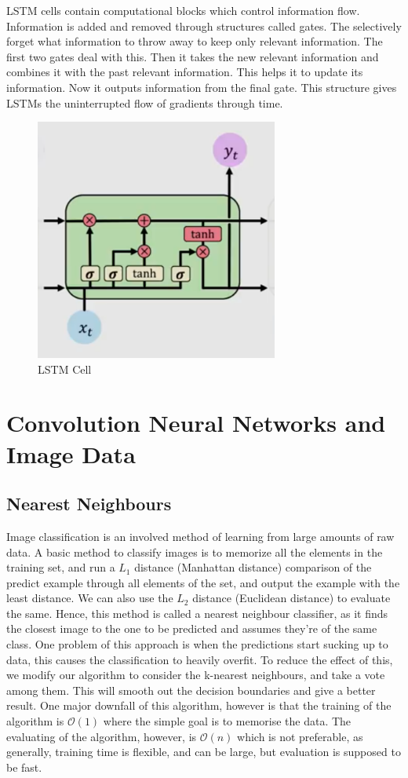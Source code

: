 \documentclass{article}
\begin{document}
LSTM cells contain computational blocks which control information flow. Information is added and removed through structures called gates. The selectively forget what information to throw away to keep only relevant information. The first two gates deal with this. Then it takes the new relevant information and combines it with the past relevant information. This helps it to update its information. Now it outputs information from the final gate. This structure gives LSTMs the uninterrupted flow of gradients through time.

\begin{figure}[h]
\includegraphics[width=8cm]{Images/lstm_cell.png}
\centering
\caption{LSTM Cell}
\end{figure}


\section{Convolution Neural Networks and Image Data}

\subsection{Nearest Neighbours}

Image classification is an involved method of learning from large amounts of raw data. A basic method to classify images is to memorize all the elements in the training set, and run a $L_1$ distance (Manhattan distance) comparison of the predict example through all elements of the set, and output the example with the least distance. We can also use the $L_2$ distance (Euclidean distance) to evaluate the same. Hence, this method is called a nearest neighbour classifier, as it finds the closest image to the one to be predicted and assumes they're of the same class. One problem of this approach is when the predictions start sucking up to data, this causes the classification to heavily overfit. To reduce the effect of this, we modify our algorithm to consider the k-nearest neighbours, and take a vote among them. This will smooth out the decision boundaries and give a better result. One major downfall of this algorithm, however is that the training of the algorithm is $\mathcal{O}(1)$ where the simple goal is to memorise the data. The evaluating of the algorithm, however, is $\mathcal{O}(n)$ which is not preferable, as generally, training time is flexible, and can be large, but evaluation is supposed to be fast.
\end{document}
